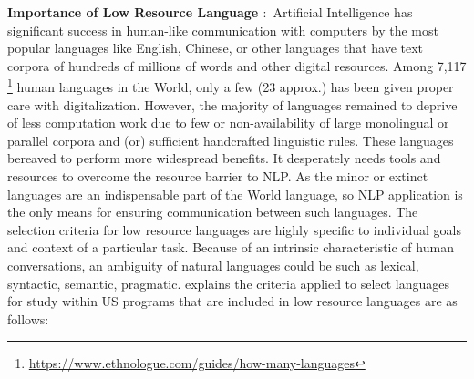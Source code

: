 \documentclass[manuscript,screen]{acmart}
\begin{document}
\textbf{Importance of Low Resource Language $\colon$}
Artificial Intelligence has significant success in human-like communication with computers by the most popular languages like English, Chinese, or other languages that have text corpora of hundreds of millions of words and other digital resources. Among 7,117 \footnote {\url{https://www.ethnologue.com/guides/how-many-languages}} human languages in the World, only a few (23 approx.) has been given proper care with digitalization.
However, the majority of languages remained to deprive of less computation work due to few or non-availability of large monolingual or parallel corpora and (or) sufficient handcrafted linguistic rules. These languages bereaved to perform more widespread benefits. It desperately needs tools and resources to overcome the resource barrier to NLP. As the minor or extinct languages are an indispensable part of the World language, so NLP application is the only means for ensuring communication between such languages.  
The selection criteria for low resource languages are highly specific to individual goals and context of a particular task. 
Because of an intrinsic characteristic of human conversations, an ambiguity of natural languages could be such as lexical, syntactic, semantic, pragmatic. \cite{cieri2016selection} explains the criteria applied to select languages for study within US programs that are included in low resource languages are as follows:
\end{document}

